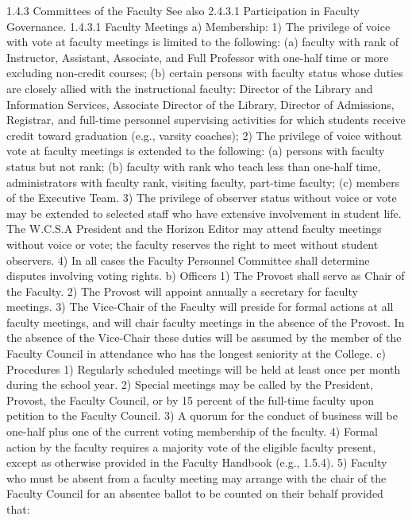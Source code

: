 \documentclass[letterpaper, 11pt]{article}
\begin{document}
			1.4.3 Committees of the Faculty
			See also 2.4.3.1 Participation in Faculty Governance.
			1.4.3.1 Faculty Meetings
			a) Membership:
			1) The privilege of voice with vote at faculty meetings is limited to the following:
			(a) faculty with rank of Instructor, Assistant, Associate, and Full Professor with one-half time or more excluding non-credit courses;
			(b) certain persons with faculty status whose duties are closely allied with the instructional faculty:  Director of the Library and Information Services, Associate Director of the Library, Director of Admissions, Registrar, and full-time personnel supervising activities for which students receive credit toward graduation (e.g., varsity coaches);
			2) The privilege of voice without vote at faculty meetings is extended to the following:
			(a) persons with faculty status but not rank;
			(b) faculty with rank who teach less than one-half time, administrators with faculty rank, visiting faculty, part-time faculty;
			(c) members of the Executive Team.
			3) The privilege of observer status without voice or vote may be extended to selected staff who have extensive involvement in student life.  The W.C.S.A President and the Horizon Editor may attend faculty meetings without voice or vote; the faculty reserves the right to meet without student observers.
			4) In all cases the Faculty Personnel Committee shall determine disputes involving voting rights.
			b) Officers
			1) The Provost shall serve as Chair of the Faculty.
			2) The Provost will appoint annually a secretary for faculty meetings.
			3) The Vice-Chair of the Faculty will preside for formal actions at all faculty meetings, and will chair faculty meetings in the absence of the Provost.  In the absence of the Vice-Chair these duties will be assumed by the member of the Faculty Council in attendance who has the longest seniority at the College.
			c) Procedures
			1) Regularly scheduled meetings will be held at least once per month during the school year.
			2) Special meetings may be called by the President, Provost, the Faculty Council, or by 15 percent of the full-time faculty upon petition to the Faculty Council.
			3) A quorum for the conduct of business will be one-half plus one of the current voting membership of the faculty.
			4) Formal action by the faculty requires a majority vote of the eligible faculty present, except as otherwise provided in the Faculty Handbook (e.g., 1.5.4).
			5) Faculty who must be absent from a faculty meeting may arrange with the chair of the Faculty Council for an absentee ballot to be counted on their behalf provided that:
\end{document}
